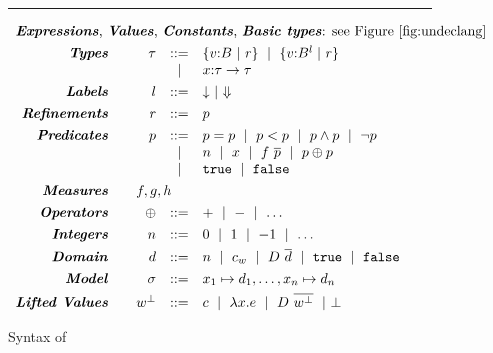 
\renewcommand\restrictdecidable[2]{#1}
\newcommand\samerule[1]{}


\begin{figure}[t!]
\hrule width 0.48\textwidth \vspace{0.05in}
$$
\begin{array}{rrcl}
\multicolumn{4}{l}{\text{\emphbf{Expressions}, \emphbf{Values}, \emphbf{Constants}, \emphbf{Basic types}:
see Figure~\ref{fig:undeclang}}} \\[0.05in]

\emphbf{Types} \quad 
  & \tau
  & ::=  
  & 	 \tref{v}{\tbase}{}{\refi}
  \spmid \tref{v}{\tbase}{l}{\refi}\\
  &&
  \spmid & \tfunref{x}{\tau}{\tau}{v}{\refi}   \\[0.05in]

\emphbf{Labels} \quad 
  & l
  & ::= 
  & \trivial \spmid \finite 
  \\[0.05in] 

\emphbf{Refinements} \quad 
  & \refi
  & ::=
  & p
  \\[0.05in] 

\emphbf{Predicates} \quad 
  & p
  & ::= 
  &   	 \lterm = \lterm
  \spmid \lterm < \lterm
  \spmid       p \land p
  \spmid \lnot p\\
  &&
  \spmid &   	 n 
  \spmid x 
  \spmid f \ \overline{\lterm}
  \spmid \lterm \oplus \lterm
  \\ && \spmid &
  \etrue
  \spmid \efalse 
  \\[0.05in] 

\emphbf{Measures} \quad 
  & \multicolumn{3}{l}{f,g,h}
  \\[0.05in] 
  
\emphbf{Operators} \quad 
  & \oplus
  & ::= 
  &   	 + 
  \spmid -  
  \spmid \dots
  \\[0.05in] 
  
\emphbf{Integers} \quad 
  & n
  & ::= 
  &   	 0 
  \spmid 1
  \spmid -1
  \spmid \dots
  \\[0.05in] 

\emphbf{Domain} \quad 
  & d
  & ::= 
  & n 
  \spmid c_w 
  \spmid D\ \overline{d}  
  \spmid \etrue
  \spmid \efalse
  \\[0.05in] 
  
\emphbf{Model} \quad 
  & \sigma & ::= & \gbind{x_1}{d_1},\ldots,\gbind{x_n}{d_n}
  \\[0.05in] 

\emphbf{Lifted Values} \quad 
  & \botv
  & ::= 
  &   	 c 
  \spmid \efun{x}{}{e} 
  \spmid D \ \overline{\botv}
  \spmid \ebot
\end{array}
$$
\caption{Syntax of \declang}
\label{fig:declang:syntax}
\end{figure}


